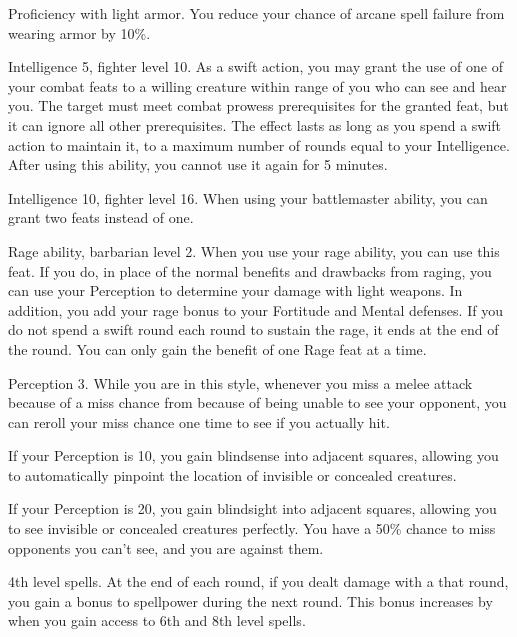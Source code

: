 \featpre Proficiency with light armor.
\featben You reduce your chance of arcane spell failure from wearing armor by 10\%.

\featpres Intelligence 5, fighter level 10.
\featben As a swift action, you may grant the use of one of your combat feats to a willing creature within \rngmed range of you who can see and hear you.
The target must meet combat prowess prerequisites for the granted feat, but it can ignore all other prerequisites.
The effect lasts as long as you spend a swift action to maintain it, to a maximum number of rounds equal to your Intelligence.
After using this ability, you cannot use it again for 5 minutes.

\featpres Intelligence 10, fighter level 16.
\featben When using your battlemaster ability, you can grant two feats instead of one.

\featpres Rage ability, barbarian level 2.
\featben When you use your rage ability, you can use this feat. If you do, in place of the normal benefits and drawbacks from raging, you can use your Perception to determine your damage with light weapons.
In addition, you add your rage bonus to your Fortitude and Mental defenses.
If you do not spend a swift round each round to sustain the rage, it ends at the end of the round.
 You can only gain the benefit of one Rage feat at a time.

\featpre Perception 3.
\featben While you are in this style, whenever you miss a melee attack because of a miss chance from because of being unable to see your opponent, you can reroll your miss chance one time to see if you actually hit.
\par If your Perception is 10, you gain blindsense into adjacent squares, allowing you to automatically pinpoint the location of invisible or concealed creatures.
\par If your Perception is 20, you gain blindsight into adjacent squares, allowing you to see invisible or concealed creatures perfectly.
You have a 50\% chance to miss opponents you can't see, and you are  against them.

\featpres 4th level spells.
\featben At the end of each round, if you dealt damage with a  that round, you gain a  bonus to spellpower during the next round.
This bonus increases by  when you gain access to 6th and 8th level spells.


